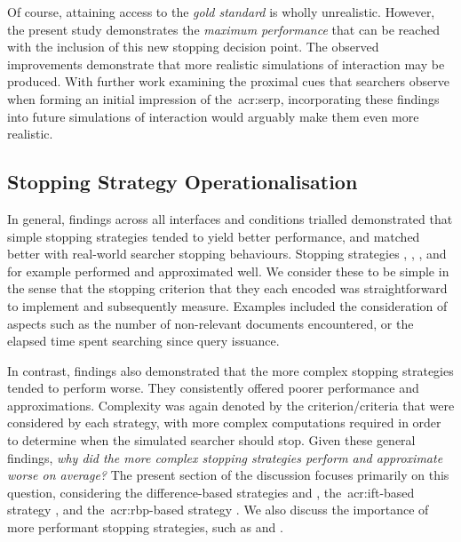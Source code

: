 Of course, attaining access to the \emph{gold standard} is wholly unrealistic. However, the present study demonstrates the \emph{maximum performance} that can be reached with the inclusion of this new stopping decision point. The observed improvements demonstrate that more realistic simulations of interaction may be produced. With further work examining the proximal cues that searchers observe when forming an initial impression of the~\gls{acr:serp}, incorporating these findings into future simulations of interaction would arguably make them even more realistic.

\subsection{Stopping Strategy Operationalisation}\label{sec:conclusions:discussion:strategies}
In general, findings across all interfaces and conditions trialled demonstrated that simple stopping strategies tended to yield better performance, and matched better with real-world searcher stopping behaviours. Stopping strategies , , ,  and  for example performed and approximated well. We consider these to be simple in the sense that the stopping criterion that they each encoded was straightforward to implement and subsequently measure. Examples included the consideration of aspects such as the number of non-relevant documents encountered, or the elapsed time spent searching since query issuance.

In contrast, findings also demonstrated that the more complex stopping strategies tended to perform worse. They consistently offered poorer performance and approximations. Complexity was again denoted by the criterion/criteria that were considered by each strategy, with more complex computations required in order to determine when the simulated searcher should stop. Given these general findings, \emph{why did the more complex stopping strategies perform and approximate worse on average?} The present section of the discussion focuses primarily on this question, considering the difference-based strategies  and , the~\gls{acr:ift}-based strategy , and the~\gls{acr:rbp}-based strategy . We also discuss the importance of more performant stopping strategies, such as  and .

